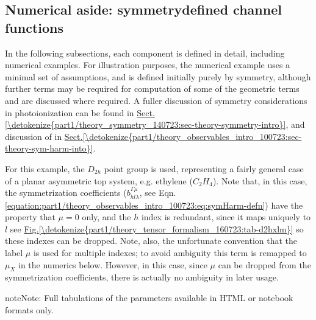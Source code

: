 \documentclass[letterpaper,table,10pt,english]{jupyterBook}
\begin{document}
\subsection{Numerical aside: symmetry\sphinxhyphen{}defined channel functions}
\label{\detokenize{part1/theory_tensor_formalism_160723:numerical-aside-symmetry-defined-channel-functions}}
\sphinxAtStartPar
In the following sub\sphinxhyphen{}sections, each component is defined in detail, including numerical examples. For illustration purposes, the numerical example uses a minimal set of assumptions, and is defined initially purely by symmetry, although further terms may be required for computation of some of the geometric terms and are discussed where required. A fuller discussion of symmetry considerations in photoionization can be found in \hyperref[\detokenize{part1/theory_symmetry_140723:sec-theory-symmetry-intro}]{Sect.\@ \ref{\detokenize{part1/theory_symmetry_140723:sec-theory-symmetry-intro}}}, and discussion of {\hyperref[\detokenize{backmatter/glossary:term-symmetrized-harmonics}]{}} in \hyperref[\detokenize{part1/theory_observables_intro_100723:sec-theory-sym-harm-into}]{Sect.\@ \ref{\detokenize{part1/theory_observables_intro_100723:sec-theory-sym-harm-into}}}.

\sphinxAtStartPar
For this example, the \(D_{2h}\) point group is used, representing a fairly general case of a planar asymmetric top system, e.g. ethylene (\(C_2H_4\)). Note that, in this case, the symmetrization coefficients (\(b_{hl\lambda}^{\Gamma\mu}\), see Eqn. \eqref{equation:part1/theory_observables_intro_100723:eq:symHarm-defn}) have the property that \(\mu=0\) only, and the \(h\) index is redundant, since it maps uniquely to \(l\) \sphinxhyphen{} see \hyperref[\detokenize{part1/theory_tensor_formalism_160723:tab-d2hxlm}]{Fig.\@ \ref{\detokenize{part1/theory_tensor_formalism_160723:tab-d2hxlm}}} \sphinxhyphen{} so these indexes can be dropped. Note, also, the unfortunate convention that the label \(\mu\) is used for multiple indexes; to avoid ambiguity this term is remapped to \(\mu_X\) in the numerics below. However, in this case, since \(\mu\) can be dropped from the symmetrization coefficients, there is actually no ambiguity in later usage.

\begin{sphinxShadowBox}
\sphinxstylesidebartitle{}

\begin{sphinxadmonition}{note}{Note:}
\sphinxAtStartPar
Full tabulations of the parameters available in HTML or notebook formats only.
\end{sphinxadmonition}
\end{sphinxShadowBox}
\end{document}
